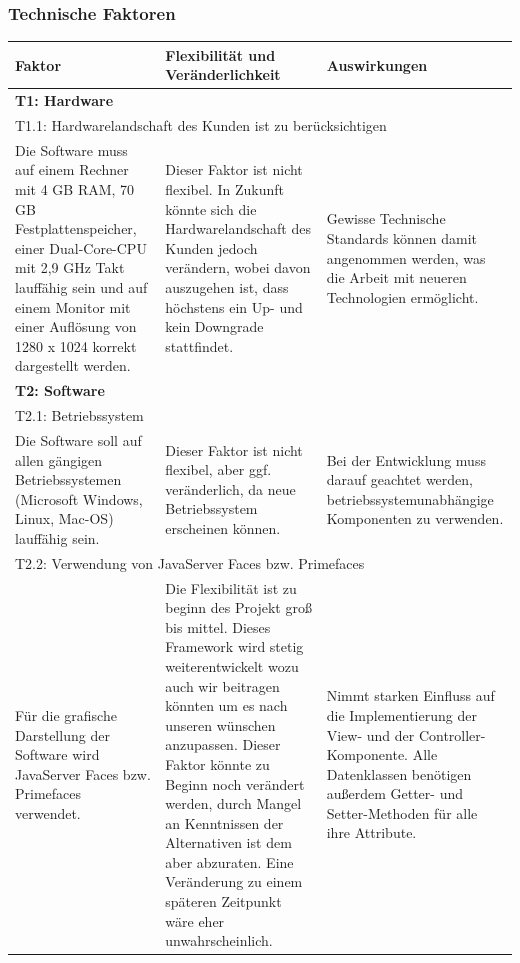 \documentclass[fontsize=12pt,paper=a4,twoside]{scrartcl}
\begin{document}
\subsubsection{Technische Faktoren}

\begin{tabularx}{\textwidth}{|X|X|X|}
\hline
\textbf{Faktor} & \textbf{Flexibilität und Veränderlichkeit} & \textbf{Auswirkungen}\\\hline
\hline
\multicolumn{3}{|l|}{\textbf{T1: Hardware}}\\\hline
\multicolumn{3}{|l|}{T1.1: Hardwarelandschaft des Kunden ist zu berücksichtigen}\\\hline
Die Software muss auf einem Rechner mit 4 GB RAM, 70 GB Festplattenspeicher, einer Dual-Core-CPU mit 2,9 GHz Takt lauffähig sein und auf einem Monitor mit einer Auflösung von 1280 x 1024 korrekt dargestellt werden. & Dieser Faktor ist nicht flexibel. In Zukunft könnte sich die Hardwarelandschaft des Kunden jedoch verändern, wobei davon auszugehen ist, dass höchstens ein Up- und kein Downgrade stattfindet. & Gewisse Technische Standards können damit angenommen werden, was die Arbeit mit neueren Technologien ermöglicht. %
 \\\hline

\multicolumn{3}{|l|}{\textbf{T2: Software}}\\\hline
\multicolumn{3}{|l|}{T2.1: Betriebssystem}\\\hline
Die Software soll auf allen gängigen Betriebssystemen (Microsoft Windows, Linux, Mac-OS) lauffähig sein. & Dieser Faktor ist nicht flexibel, aber ggf. veränderlich, da neue Betriebssystem erscheinen können. & Bei der Entwicklung muss darauf geachtet werden, betriebssystemunabhängige Komponenten zu verwenden.\\\hline
\multicolumn{3}{|l|}{T2.2: Verwendung von JavaServer Faces bzw. Primefaces}\\\hline
Für die grafische Darstellung der Software wird JavaServer Faces bzw. Primefaces verwendet. &
Die Flexibilität ist zu beginn des Projekt groß bis mittel. Dieses Framework wird stetig weiterentwickelt wozu auch wir beitragen könnten um es nach unseren wünschen anzupassen.
 Dieser Faktor könnte zu Beginn noch verändert werden, durch Mangel an Kenntnissen der Alternativen ist dem aber abzuraten. Eine Veränderung zu einem späteren Zeitpunkt wäre eher unwahrscheinlich. & Nimmt starken Einfluss auf die Implementierung der View- und der Controller-Komponente. Alle Datenklassen benötigen außerdem Getter- und Setter-Methoden für alle ihre Attribute. \\\hline
\end{tabularx} \clearpage
\end{document}
